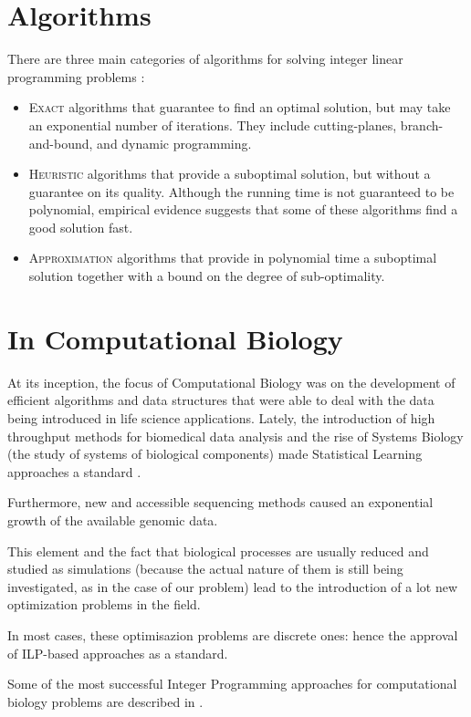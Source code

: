 \section{Algorithms}
There are three main categories of algorithms for solving integer linear programming problems \cite{ilpalg}:
\begin{itemize}
	\item \textsc{Exact} algorithms that guarantee to find an optimal solution, but may take an exponential number of iterations. They include cutting-planes, branch-and-bound, and dynamic programming.
	\item \textsc{Heuristic} algorithms that provide a suboptimal solution, but without a guarantee on its quality. Although the running time is not guaranteed to be polynomial, empirical evidence suggests that some of these algorithms find a good solution fast.
	\item \textsc{Approximation} algorithms that provide in polynomial time a suboptimal solution together with a bound on the degree of sub-optimality.
\end{itemize}

\section{In Computational Biology}

At its inception, the focus of Computational Biology was on the development of efficient algorithms and data structures that were able to deal with the data being introduced in life science applications. Lately, the introduction of high throughput methods for biomedical data analysis and the rise of Systems Biology (the study of systems of biological components) made Statistical Learning approaches a standard \cite{ilpinb}.

Furthermore, new and accessible sequencing methods caused an exponential growth of the available genomic data.

This element and the fact that biological processes are usually reduced and studied as simulations (because the actual nature of them is still being investigated, as in the case of our problem) lead to the introduction of a lot new optimization problems in the field.

In most cases, these optimisazion problems are discrete ones: hence the approval of ILP-based approaches as a standard.

Some of the most successful Integer Programming approaches for computational biology problems are described in \cite{lancia2004}.

